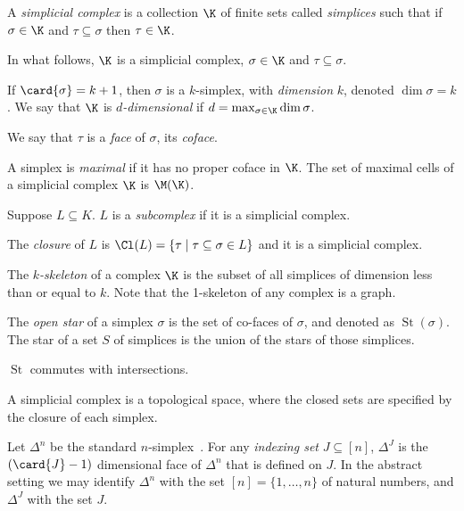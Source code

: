 \begin{definition}
A \emph{simplicial complex} is a collection $\K$ of finite sets called
\emph{simplices} such that if $\sigma \in \K$ and $\tau \subseteq \sigma$ then $\tau \in \K$. 
\end{definition}
In what follows, $\K$ is a simplicial complex, $\sigma \in \K$ and $\tau \subseteq \sigma$.
\begin{definition}[Dimension]
If $\card{\sigma} = k+1$, then $\sigma$ is a $k$-simplex, with \emph{dimension} $k$, denoted 
$\dim{\sigma} = k$. We say that $\K$ is \emph{$d$-dimensional} if 
$d = \max_{\sigma \in \K} \dim{\sigma}$.
\end{definition}
\begin{definition}
We say that $\tau$ is a \emph{face} of $\sigma$, its \emph{coface}. 
\end{definition}
\begin{definition}
A simplex is \emph{maximal} if it has no proper coface in $\K$. The set of maximal cells of a simplicial complex $\K$ is $\M(\K)$. 
\end{definition}
\begin{definition}[Subcomplexes]
Suppose $L \subseteq K$.  $L$ is a \emph{subcomplex} if it is a simplicial complex.
\end{definition}
\begin{definition}[Closure]
 The \emph{closure} of $L$ is $\Cl(L) = \{ \tau \mid \tau \subseteq \sigma \in L\}$ and it is a simplicial complex.
\end{definition}
\begin{definition}[$k$-skeleton]
The  \emph{$k$-skeleton} of a complex $\K$ is the subset of all simplices
of dimension less than or equal to $k$. Note that the 1-skeleton of
any complex is a graph.
\end{definition}
\begin{definition}
The \emph{open star} of a simplex $\sigma$ is the set of co-faces of $\sigma$, and denoted as $\operatorname{St}(\sigma)$. The star of a set $S$ of simplices is the union of the stars of those simplices.
\end{definition}
\begin{lemma}
$\operatorname{St}$ commutes with intersections.
\label{lem:st-inter}
\end{lemma}
A simplicial complex is a topological space, where the closed sets are specified by the closure of each simplex.
\begin{definition}
Let $\Delta^n$ be the standard $n$-simplex~\cite{hatcher}. For any
\emph{indexing set} $J \subseteq [n]$, $\Delta^J$ is the $(\card{J}-1)$ 
dimensional face of $\Delta^n$  that is defined on $J$. In the abstract setting we may
identify $\Delta^n$ with the set $[n] = \{1, \ldots, n\}$ of natural numbers, and $\Delta^J$ with the set $J$.
\end{definition}
